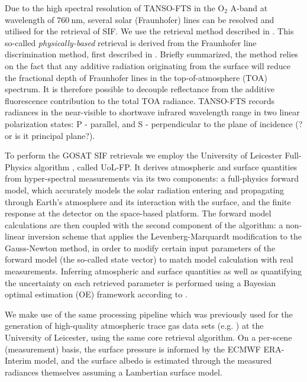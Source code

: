 \documentclass[preprint, a4paper, 10pt, times]{elsarticle}
\begin{document}
Due to the high spectral resolution of TANSO-FTS in the O$_2$ A-band at wavelength of $760\:\mathrm{nm}$, several solar (Fraunhofer) lines can be resolved and utilised for the retrieval of SIF. We use the retrieval method described in \citet{Frankenberg2011}. This so-called \textit{physically-based} retrieval is derived from the Fraunhofer line discrimination method, first described in \citet{plascyk_fraunhofer_1975}. Briefly summarized, the method relies on the fact that any additive radiation originating from the surface will reduce the fractional depth of Fraunhofer lines in the top-of-atmosphere (TOA) spectrum. It is therefore possible to decouple reflectance from the additive fluorescence contribution to the total TOA radiance. TANSO-FTS records radiances in the near-visible to shortwave infrared wavelength range in two linear polarization states: P - parallel, and S - perpendicular to the plane of incidence (? or is it principal plane?).

To perform the GOSAT SIF retrievals we employ the University of Leicester Full-Physics algorithm \citep{Cogan2012}, called UoL-FP. It derives atmospheric and surface quantities from hyper-spectral measurements via its two components: a full-physics forward model, which accurately models the solar radiation entering and propagating through Earth's atmosphere and its interaction with the surface, and the finite response at the detector on the space-based platform. The forward model calculations are then coupled with the second component of the algorithm: a non-linear inversion scheme that applies the Levenberg-Marquardt modification to the Gauss-Newton method, in order to modify certain input parameters of the forward model (the so-called state vector) to match model calculation with real measurements. Inferring atmospheric and surface quantities as well as quantifying the uncertainty on each retrieved parameter is performed using a Bayesian optimal estimation (OE) framework according to \citet{Rodgers2000}.

We make use of the same processing pipeline which was previously used for the generation of high-quality atmospheric trace gas data sets (e.g. \citet{Buchwitz2017,Trent2018}) at the University of Leicester, using the same core retrieval algorithm. On a per-scene (measurement) basis, the surface pressure is informed by the ECMWF ERA-Interim model, and the surface albedo is estimated through the measured radiances themselves assuming a Lambertian surface model.
\end{document}

